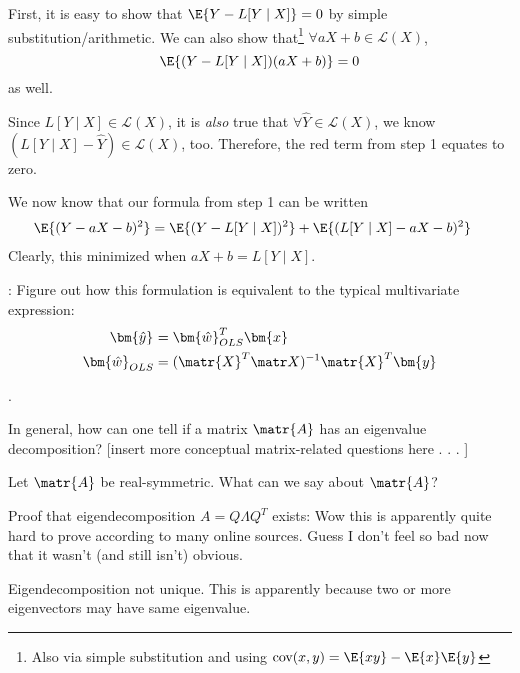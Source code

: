 \documentclass[11pt]{article}
\renewcommand\vec[2][]{\bm{#2}_{#1}}
\newcommand\myspace[1][]{\vspace{#1\bigskipamount}}
\newcommand\p{\Needspace{10\baselineskip} \noindent}
\begin{document}
\begin{compactitem}
\begin{algorithm}
\begin{compactenum}
			\item First, it is easy to show that $\E{Y - L[Y \mid X]} = 0$ by simple substitution/arithmetic. We can also show that\footnote{Also via simple substitution and using $\text{cov}(x, y) = \E{xy} - \E{x}\E{y}$} $\forall aX + b \in \mathcal{L}(X)$, $$\E{(Y - L[Y \mid X])(aX + b)} = 0$$ as well.
			
			\item Since $L[Y \mid X] \in \mathcal{L}(X)$, it is \textit{also} true that $\forall \hat Y \in \mathcal{L}(X)$, we know $(L[Y \mid X] - \hat Y) \in \mathcal{L}(X)$, too. Therefore, the red term from step 1 equates to zero. 
			
			\item We now know that our formula from step 1 can be written
			\begin{align}
				\E{(Y - aX - b)^2}
				&= \E{(Y - L[Y \mid X])^2}  + \E{(L[Y \mid X] - aX - b)^2}
			\end{align}
			Clearly, this minimized when $aX + b = L[Y \mid X]$. 		
		\end{compactenum}
	\end{algorithm}
	: Figure out how this formulation is equivalent to the typical multivariate expression:
	\begin{align}
		\vec{\hat y} 
			&= \vec[OLS]{\hat w}^T \vec x \\
		\vec[OLS]{\hat w}
			&= (\matr{X}^T \matr X)^{-1} \matr{X}^T \vec y
	\end{align}
\end{compactitem}

\myspace
\p {}.
\begin{compactitem}
	
	\item {} In general, how can one tell if a matrix $\matr{A}$ has an eigenvalue decomposition? [insert more conceptual matrix-related questions here . . . ]
	
	\item {} Let $\matr{A}$ be real-symmetric. What can we say about $\matr{A}$?
	\begin{compactitem}
		\item Proof that eigendecomposition $A = Q\Lambda Q^T$ exists: Wow this is apparently quite hard to prove according to many online sources. Guess I don't feel so bad now that it wasn't (and still isn't) obvious. 
		
		\item Eigendecomposition not unique. This is apparently because two or more eigenvectors may have same eigenvalue. 
	\end{compactitem}
\end{compactitem}
\end{document}
